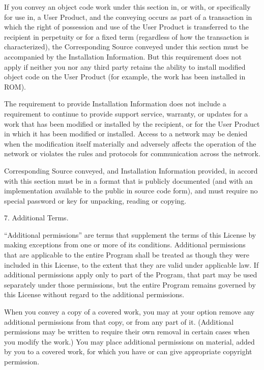 \documentclass[letterpaper,10pt,english]{sphinxmanual}
\begin{document}
\begin{sphinxVerbatim}[commandchars=\\\{\}]
   If you convey an object code work under this section in, or with, or
   specifically for use in, a User Product, and the conveying occurs as part of
   a transaction in which the right of possession and use of the User Product
   is transferred to the recipient in perpetuity or for a fixed term
   (regardless of how the transaction is characterized), the Corresponding
   Source conveyed under this section must be accompanied by the Installation
   Information. But this requirement does not apply if neither you nor any
   third party retains the ability to install modified object code on the User
   Product (for example, the work has been installed in ROM).

   The requirement to provide Installation Information does not include a
   requirement to continue to provide support service, warranty, or updates for
   a work that has been modified or installed by the recipient, or for the User
   Product in which it has been modified or installed. Access to a network may
   be denied when the modification itself materially and adversely affects the
   operation of the network or violates the rules and protocols for
   communication across the network.

   Corresponding Source conveyed, and Installation Information provided, in
   accord with this section must be in a format that is publicly documented
   (and with an implementation available to the public in source code form),
   and must require no special password or key for unpacking, reading or
   copying.

 7. Additional Terms.

    “Additional permissions” are terms that supplement the terms of this
    License by making exceptions from one or more of its conditions. Additional
    permissions that are applicable to the entire Program shall be treated as
    though they were included in this License, to the extent that they are
    valid under applicable law. If additional permissions apply only to part of
    the Program, that part may be used separately under those permissions, but
    the entire Program remains governed by this License without regard to the
    additional permissions.

    When you convey a copy of a covered work, you may at your option remove any
    additional permissions from that copy, or from any part of it. (Additional
    permissions may be written to require their own removal in certain cases
    when you modify the work.) You may place additional permissions on
    material, added by you to a covered work, for which you have or can give
    appropriate copyright permission.


\end{sphinxVerbatim}
\end{document}
